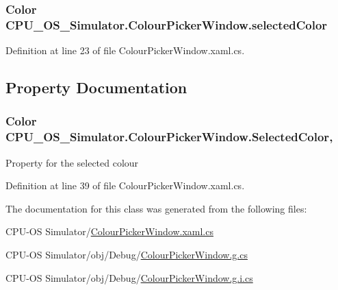 \subsubsection[{selected\+Color}]{\setlength{\rightskip}{0pt plus 5cm}Color C\+P\+U\+\_\+\+O\+S\+\_\+\+Simulator.\+Colour\+Picker\+Window.\+selected\+Color\hspace{0.3cm}{\ttfamily [private]}}\label{class_c_p_u___o_s___simulator_1_1_colour_picker_window_a1c1653bebad209bd313da5a18ecea9bc}


Definition at line 23 of file Colour\+Picker\+Window.\+xaml.\+cs.



\subsection{Property Documentation}
\hypertarget{class_c_p_u___o_s___simulator_1_1_colour_picker_window_a4e51070f2e58d178bf773acb4200e76e}{}
\subsubsection[{Selected\+Color}]{\setlength{\rightskip}{0pt plus 5cm}Color C\+P\+U\+\_\+\+O\+S\+\_\+\+Simulator.\+Colour\+Picker\+Window.\+Selected\+Color\hspace{0.3cm}{\ttfamily [get]}, {\ttfamily [set]}}\label{class_c_p_u___o_s___simulator_1_1_colour_picker_window_a4e51070f2e58d178bf773acb4200e76e}


Property for the selected colour 



Definition at line 39 of file Colour\+Picker\+Window.\+xaml.\+cs.



The documentation for this class was generated from the following files\+:\begin{DoxyCompactItemize}
\item 
C\+P\+U-\/\+O\+S Simulator/\hyperlink{_colour_picker_window_8xaml_8cs}{Colour\+Picker\+Window.\+xaml.\+cs}\item 
C\+P\+U-\/\+O\+S Simulator/obj/\+Debug/\hyperlink{_colour_picker_window_8g_8cs}{Colour\+Picker\+Window.\+g.\+cs}\item 
C\+P\+U-\/\+O\+S Simulator/obj/\+Debug/\hyperlink{_colour_picker_window_8g_8i_8cs}{Colour\+Picker\+Window.\+g.\+i.\+cs}\end{DoxyCompactItemize}
